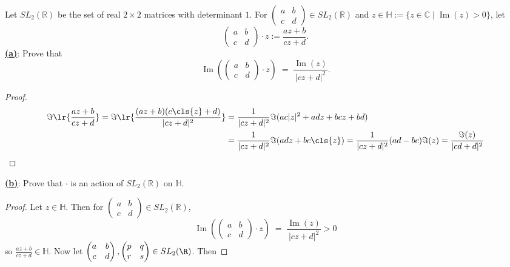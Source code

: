 \documentclass[12pt]{article}
\begin{document}
\begin{homeworkProblem}
Let $SL_2(\mathbb{R})$ be the set of real $2\times 2$ matrices with determinant $1$. For
$\begin{pmatrix} a & b \\ c & d \end{pmatrix} \in SL_2(\mathbb{R})$ and $z \in \mathbb{H} := \{ z \in \mathbb{C} \mid \operatorname{Im}(z) > 0\}$, let
\[
  \begin{pmatrix} a & b \\ c & d \end{pmatrix} \cdot z := \frac{az + b}{cz + d}.
\]
\underline{\textbf{(a)}}: Prove that
  \[
    \operatorname{Im}\!\left( \begin{pmatrix} a & b \\ c & d \end{pmatrix} \cdot z \right)
    \;=\; \frac{\operatorname{Im}(z)}{\lvert cz + d\rvert^{2}}.
  \]

\begin{proof}
  \begin{align*}
    \Im\lr{ \frac{az+b}{cz+d} }= \Im\lr{\frac{(az+b)(c \cls{z}+d)}{|cz+d|^{2}}} &= \frac{1}{|cz+d|^{2}}\Im(ac|z|^{2}+adz+bcz+bd)\\
    &=\frac{1}{|cz+d|^{2}}\Im(adz+bc \cls{z}) = \frac{1}{|cz+d|^{2}}(ad-bc)\Im(z) = \frac{\Im(z)}{|cd+d|^{2}}\\
  \end{align*}
\end{proof}

\underline{\textbf{(b)}}: Prove that $\cdot$ is an action of $SL_2(\mathbb{R})$ on $\mathbb{H}$.

\begin{proof}
  Let $ z\in \mathbb{H} $. Then for $\begin{pmatrix} a & b \\ c & d \end{pmatrix} \in SL_2(\mathbb{R})$, 
  \[
    \operatorname{Im}\!\left( \begin{pmatrix} a & b \\ c & d \end{pmatrix} \cdot z \right)
    \;=\; \frac{\operatorname{Im}(z)}{\lvert cz + d\rvert^{2}} >0
  \]
  so $ \frac{az+b}{cz+d}\in \mathbb{H} $. Now let $\begin{pmatrix} a & b \\ c & d \end{pmatrix}, \begin{pmatrix} p & q \\ r & s \end{pmatrix}\in SL_{2}(\R)$. Then 


\end{proof}
\end{homeworkProblem}
\end{document}
